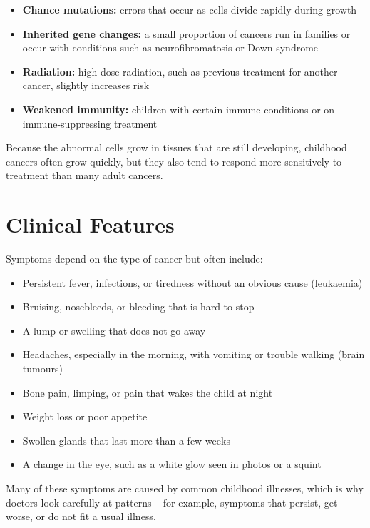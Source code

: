 \begin{itemize}
    \item \textbf{Chance mutations:} errors that occur as cells divide rapidly during growth
    \item \textbf{Inherited gene changes:} a small proportion of cancers run in families or occur with conditions such as neurofibromatosis or Down syndrome
    \item \textbf{Radiation:} high-dose radiation, such as previous treatment for another cancer, slightly increases risk
    \item \textbf{Weakened immunity:} children with certain immune conditions or on immune-suppressing treatment
\end{itemize}

Because the abnormal cells grow in tissues that are still developing, childhood cancers often grow quickly, but they also tend to respond more sensitively to treatment than many adult cancers.

\section*{Clinical Features}
Symptoms depend on the type of cancer but often include:

\begin{itemize}
    \item Persistent fever, infections, or tiredness without an obvious cause (leukaemia)
    \item Bruising, nosebleeds, or bleeding that is hard to stop
    \item A lump or swelling that does not go away
    \item Headaches, especially in the morning, with vomiting or trouble walking (brain tumours)
    \item Bone pain, limping, or pain that wakes the child at night
    \item Weight loss or poor appetite
    \item Swollen glands that last more than a few weeks
    \item A change in the eye, such as a white glow seen in photos or a squint
\end{itemize}

Many of these symptoms are caused by common childhood illnesses, which is why doctors look carefully at patterns -- for example, symptoms that persist, get worse, or do not fit a usual illness.

